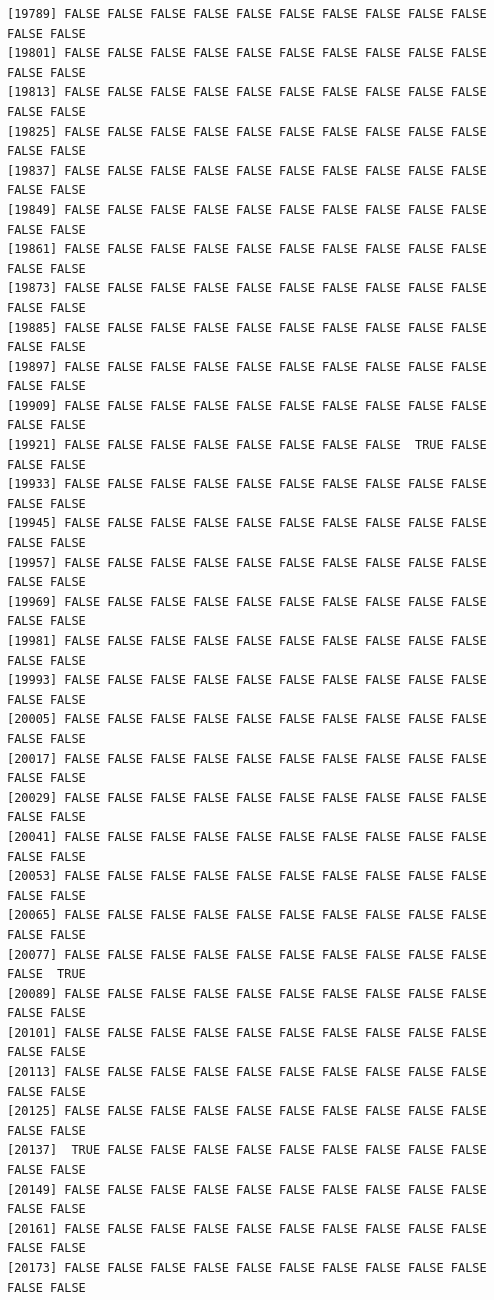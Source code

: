 \documentclass[
  a4paper,
  DIV=11,
  numbers=noendperiod]{scrartcl}
\begin{document}
\begin{verbatim}
[19789] FALSE FALSE FALSE FALSE FALSE FALSE FALSE FALSE FALSE FALSE FALSE FALSE
[19801] FALSE FALSE FALSE FALSE FALSE FALSE FALSE FALSE FALSE FALSE FALSE FALSE
[19813] FALSE FALSE FALSE FALSE FALSE FALSE FALSE FALSE FALSE FALSE FALSE FALSE
[19825] FALSE FALSE FALSE FALSE FALSE FALSE FALSE FALSE FALSE FALSE FALSE FALSE
[19837] FALSE FALSE FALSE FALSE FALSE FALSE FALSE FALSE FALSE FALSE FALSE FALSE
[19849] FALSE FALSE FALSE FALSE FALSE FALSE FALSE FALSE FALSE FALSE FALSE FALSE
[19861] FALSE FALSE FALSE FALSE FALSE FALSE FALSE FALSE FALSE FALSE FALSE FALSE
[19873] FALSE FALSE FALSE FALSE FALSE FALSE FALSE FALSE FALSE FALSE FALSE FALSE
[19885] FALSE FALSE FALSE FALSE FALSE FALSE FALSE FALSE FALSE FALSE FALSE FALSE
[19897] FALSE FALSE FALSE FALSE FALSE FALSE FALSE FALSE FALSE FALSE FALSE FALSE
[19909] FALSE FALSE FALSE FALSE FALSE FALSE FALSE FALSE FALSE FALSE FALSE FALSE
[19921] FALSE FALSE FALSE FALSE FALSE FALSE FALSE FALSE  TRUE FALSE FALSE FALSE
[19933] FALSE FALSE FALSE FALSE FALSE FALSE FALSE FALSE FALSE FALSE FALSE FALSE
[19945] FALSE FALSE FALSE FALSE FALSE FALSE FALSE FALSE FALSE FALSE FALSE FALSE
[19957] FALSE FALSE FALSE FALSE FALSE FALSE FALSE FALSE FALSE FALSE FALSE FALSE
[19969] FALSE FALSE FALSE FALSE FALSE FALSE FALSE FALSE FALSE FALSE FALSE FALSE
[19981] FALSE FALSE FALSE FALSE FALSE FALSE FALSE FALSE FALSE FALSE FALSE FALSE
[19993] FALSE FALSE FALSE FALSE FALSE FALSE FALSE FALSE FALSE FALSE FALSE FALSE
[20005] FALSE FALSE FALSE FALSE FALSE FALSE FALSE FALSE FALSE FALSE FALSE FALSE
[20017] FALSE FALSE FALSE FALSE FALSE FALSE FALSE FALSE FALSE FALSE FALSE FALSE
[20029] FALSE FALSE FALSE FALSE FALSE FALSE FALSE FALSE FALSE FALSE FALSE FALSE
[20041] FALSE FALSE FALSE FALSE FALSE FALSE FALSE FALSE FALSE FALSE FALSE FALSE
[20053] FALSE FALSE FALSE FALSE FALSE FALSE FALSE FALSE FALSE FALSE FALSE FALSE
[20065] FALSE FALSE FALSE FALSE FALSE FALSE FALSE FALSE FALSE FALSE FALSE FALSE
[20077] FALSE FALSE FALSE FALSE FALSE FALSE FALSE FALSE FALSE FALSE FALSE  TRUE
[20089] FALSE FALSE FALSE FALSE FALSE FALSE FALSE FALSE FALSE FALSE FALSE FALSE
[20101] FALSE FALSE FALSE FALSE FALSE FALSE FALSE FALSE FALSE FALSE FALSE FALSE
[20113] FALSE FALSE FALSE FALSE FALSE FALSE FALSE FALSE FALSE FALSE FALSE FALSE
[20125] FALSE FALSE FALSE FALSE FALSE FALSE FALSE FALSE FALSE FALSE FALSE FALSE
[20137]  TRUE FALSE FALSE FALSE FALSE FALSE FALSE FALSE FALSE FALSE FALSE FALSE
[20149] FALSE FALSE FALSE FALSE FALSE FALSE FALSE FALSE FALSE FALSE FALSE FALSE
[20161] FALSE FALSE FALSE FALSE FALSE FALSE FALSE FALSE FALSE FALSE FALSE FALSE
[20173] FALSE FALSE FALSE FALSE FALSE FALSE FALSE FALSE FALSE FALSE FALSE FALSE

\end{verbatim}
\end{document}
